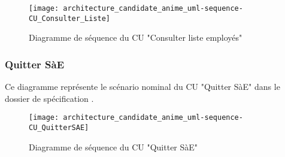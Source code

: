 \begin{figure} [H]
    \centering
    \texttt{[image: architecture\_candidate\_anime\_uml-sequence-CU\_Consulter\_Liste]}
    \caption{Diagramme de séquence du CU "Consulter liste employés"}
    \label{CU-Consulter_Liste}
\end{figure}

\subsubsection{Quitter SàE} %
Ce diagramme représente le scénario nominal du CU "Quitter SàE" dans le dossier de spécification .\\

\begin{figure} [H]
    \centering
    \texttt{[image: architecture\_candidate\_anime\_uml-sequence-CU\_QuitterSAE]}
    \caption{Diagramme de séquence du CU "Quitter SàE"}
    \label{CU-Quitter}
\end{figure}